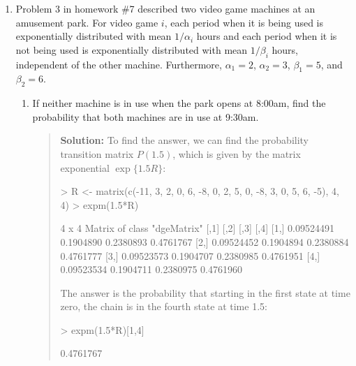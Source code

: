 \documentclass{article}
\begin{document}
\begin{enumerate}
\begin{enumerate}
    \end{enumerate}

  \item Problem 3 in homework \#7 described two video game machines at an
  amusement park. For video game $i$, each period when it is being used is
  exponentially distributed with mean $1/\alpha_i$ hours and each period when it
  is not being used is exponentially distributed with mean $1/\beta_i$ hours,
  independent of the other machine. Furthermore, $\alpha_1=2$, $\alpha_2=3$,
  $\beta_1=5$, and $\beta_2=6$.
  
    \begin{enumerate}
    
    \item If neither machine is in use when the park opens at 8:00am, find the
    probability that both machines are in use at 9:30am.
    \begin{quotation}{\bf Solution:}
    To find the answer, we can find the probability transition matrix $P(1.5)$,
    which is given by the matrix exponential $\exp\{ 1.5 R\}$:
\begin{Schunk}
\begin{Sinput}
> R <- matrix(c(-11, 3, 2, 0, 6, -8, 0, 2, 5, 0, -8, 3, 0, 5, 6, -5), 4, 4)
> expm(1.5*R)
\end{Sinput}
\begin{Soutput}
4 x 4 Matrix of class "dgeMatrix"
           [,1]      [,2]      [,3]      [,4]
[1,] 0.09524491 0.1904890 0.2380893 0.4761767
[2,] 0.09524452 0.1904894 0.2380884 0.4761777
[3,] 0.09523573 0.1904707 0.2380985 0.4761951
[4,] 0.09523534 0.1904711 0.2380975 0.4761960
\end{Soutput}
\end{Schunk}
    The answer is the probability that starting in the first state at time zero,
    the chain is in the fourth state at time 1.5:
\begin{Schunk}
\begin{Sinput}
> expm(1.5*R)[1,4]
\end{Sinput}
\begin{Soutput}
[1] 0.4761767
\end{Soutput}
\end{Schunk}
    \end{quotation}
    

\end{enumerate}
\end{enumerate}
\end{document}

